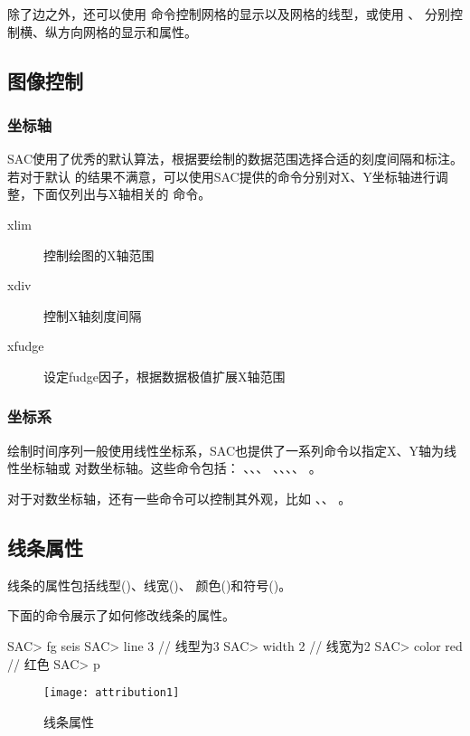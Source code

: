除了边之外，还可以使用  命令控制网格的显示以及网格的线型，或使用
、 分别控制横、纵方向网格的显示和属性。

\subsection{图像控制}
\subsubsection{坐标轴}
SAC使用了优秀的默认算法，根据要绘制的数据范围选择合适的刻度间隔和标注。若对于默认
的结果不满意，可以使用SAC提供的命令分别对X、Y坐标轴进行调整，下面仅列出与X轴相关的
命令。
\begin{description}
\item [xlim] 控制绘图的X轴范围
\item [xdiv] 控制X轴刻度间隔
\item [xfudge] 设定fudge因子，根据数据极值扩展X轴范围
\end{description}

\subsubsection{坐标系}
绘制时间序列一般使用线性坐标系，SAC也提供了一系列命令以指定X、Y轴为线性坐标轴或
对数坐标轴。这些命令包括： 、、、
、、、、
。

对于对数坐标轴，还有一些命令可以控制其外观，比如 、、
。

\subsection{线条属性}
\label{subsec:line-attribution}

线条的属性包括线型()、线宽()、
颜色()和符号()。

下面的命令展示了如何修改线条的属性。
\begin{SACCode}
SAC> fg seis
SAC> line 3         // 线型为3
SAC> width 2        // 线宽为2
SAC> color red      // 红色
SAC> p
\end{SACCode}

\begin{figure}[H]
\centering
\texttt{[image: attribution1]}
\caption{线条属性}
\end{figure}

